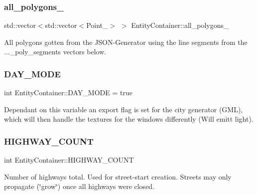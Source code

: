 \subsubsection{\texorpdfstring{all\+\_\+polygons\+\_\+}{all\_polygons\_}}
{\footnotesize\ttfamily std\+::vector$<$std\+::vector$<$Point\+\_$>$ $>$ Entity\+Container\+::all\+\_\+polygons\+\_\+}

All polygons gotten from the J\+S\+O\+N-\/\+Generator using the line segments from the ...\+\_\+poly\+\_\+segments vectors below. \hypertarget{class_entity_container_a903b71e2c4be9c3e1d09f15e43535117}{}\label{class_entity_container_a903b71e2c4be9c3e1d09f15e43535117} 
\subsubsection{\texorpdfstring{D\+A\+Y\+\_\+\+M\+O\+DE}{DAY\_MODE}}
{\footnotesize\ttfamily int Entity\+Container\+::\+D\+A\+Y\+\_\+\+M\+O\+DE = true}

Dependant on this variable an export flag is set for the city generator (G\+ML), which will then handle the textures for the windows differently (Will emitt light). \hypertarget{class_entity_container_a9e2ee21384cc1ed4a2a74a2dbb57afa2}{}\label{class_entity_container_a9e2ee21384cc1ed4a2a74a2dbb57afa2} 
\subsubsection{\texorpdfstring{H\+I\+G\+H\+W\+A\+Y\+\_\+\+C\+O\+U\+NT}{HIGHWAY\_COUNT}}
{\footnotesize\ttfamily int Entity\+Container\+::\+H\+I\+G\+H\+W\+A\+Y\+\_\+\+C\+O\+U\+NT}

Number of highways total. Used for street-\/start creation. Streets may only propagate (\char`\"{}grow\char`\"{}) once all highways were closed. \hypertarget{class_entity_container_a3ef34e622b3fa04986935d20c503ae53}{}\label{class_entity_container_a3ef34e622b3fa04986935d20c503ae53} 
